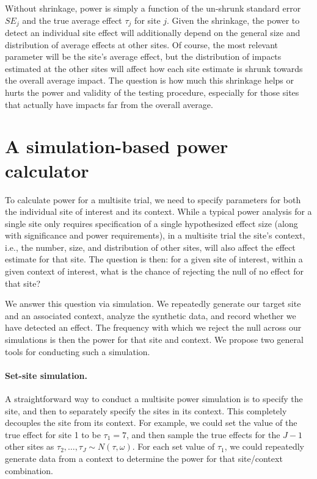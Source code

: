 \documentclass[]{article}
\begin{document}
Without shrinkage, power is simply a function of the un-shrunk standard error $SE_j$ and the true average effect $\tau_j$ for site $j$.
Given the shrinkage, the power to detect an individual site effect will additionally depend on the general size and distribution of average effects at other sites.
Of course, the most relevant parameter will be the site's average effect, but the distribution of impacts estimated at the other sites will affect how each site estimate is shrunk towards the overall average impact.
The question is how much this shrinkage helps or hurts the power and validity of the testing procedure, especially for those sites that actually have impacts far from the overall average.


\section{A simulation-based power calculator}

To calculate power for a multisite trial, we need to specify parameters for both the individual site of interest and its context.
While a typical power analysis for a single site only requires specification of a single hypothesized effect size (along with significance and power requirements), in a multisite trial the site's context, i.e., the number, size, and distribution of other sites, will also affect the effect estimate for that site.
The question is then: for a given site of interest, within a given context of interest, what is the chance of rejecting the null of no effect for that site?

We answer this question via simulation.
We repeatedly generate our target site and an associated context, analyze the synthetic data, and record whether we have detected an effect.
The frequency with which we reject the null across our simulations is then the power for that site and context.
We propose two general tools for conducting such a simulation.

\paragraph{Set-site simulation.} A straightforward way to conduct a multisite power simulation is to specify the site, and then to separately specify the sites in its context.
This completely decouples the site from its context.
For example, we could set the value of the true effect for site 1 to be $\tau_1 = 7$, and then sample the true effects for the $J-1$ other sites as $\tau_2, \dots, \tau_J \sim N(\tau, \omega)$.
For each set value of $\tau_1$, we could repeatedly generate data from a context to determine the power for that site/context combination.
\end{document}
